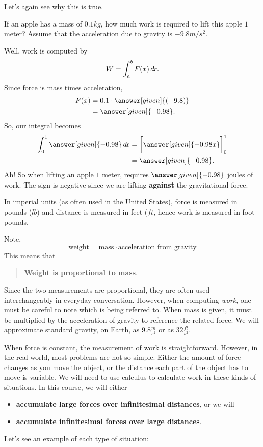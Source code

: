 \documentclass{ximera}
\begin{document}
Let's again see why this is true.
\begin{example}
  If an apple has a mass of $0.1\unit{kg}$, how much work is required
  to lift this apple $1$ meter?  Assume that the acceleration due to
  gravity is $-9.8\unit{m}/\unit{s}^2$.
  \begin{explanation}
    Well, work is computed by
    \[
    W = \int_{a}^{b} F(x) \mathop{}\!d\! x.
    \]
    Since force is mass times acceleration,
    \begin{align*}
      F(x) &= 0.1\cdot \answer[given]{(-9.8)} \\
      &= \answer[given]{-0.98}.
    \end{align*}
    So, our integral becomes
    \begin{align*}
      \int_{0}^{1} \answer[given]{-0.98} \d x &= \eval{\answer[given]{-0.98 x}}_0^1\\
      &=\answer[given]{-0.98}.
    \end{align*}
    Ah! So when lifting an apple $1$ meter, requires $\answer[given]{-0.98}$ joules of
    work. The sign is negative since we are lifting \textbf{against}
    the gravitational force.
  \end{explanation}
\end{example}
In imperial units (as often used in the United States), force is
measured in pounds ($\unit{lb}$) and distance is measured in feet
($\unit{ft}$, hence work is measured in foot-pounds.



\begin{warning}
  Note,
  \[
  \mathrm{weight} = \mathrm{mass}\cdot\textrm{acceleration from gravity}
  \]
  This means that
  \begin{quote}
    \textbf{Weight is proportional to mass}.
  \end{quote}
  Since the two measurements are proportional, they are often used
  interchangeably in everyday conversation. However, when computing
  \textit{work}, one must be careful to note which is being referred
  to. When mass is given, it must be multiplied by the acceleration of
  gravity to reference the related force.  We will approximate
  standard gravity, on Earth, as $9.8\frac{\unit{m}}{\unit{s}^2}$ or
  as $32 \frac{\unit{ft}}{\unit{s}^2}$.
\end{warning}

When force is constant, the measurement of work is straightforward.
However, in the real world, most problems are not so simple.  Either
the amount of force changes as you move the object, or the distance
each part of the object has to move is variable.  We will need to use
calculus to calculate work in these kinds of situations.  In this
course, we will either
\begin{itemize}
  \item \textbf{accumulate large forces over infinitesimal distances}, or we
    will
  \item \textbf{accumulate infinitesimal forces over large distances}.
\end{itemize}
Let's see an example of each type of situation:
\end{document}
